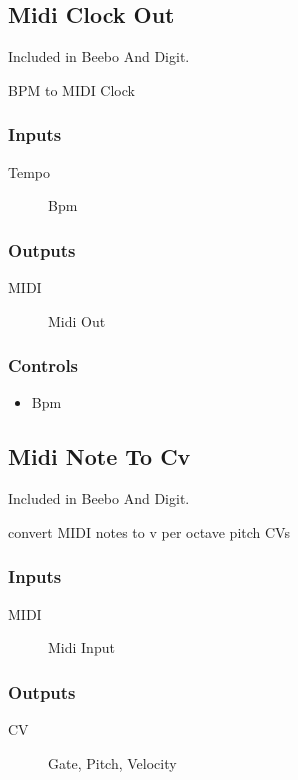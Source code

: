 \subsection{Midi Clock Out}

Included in Beebo And Digit.

BPM to MIDI Clock



\subsubsection{Inputs}
\begin{description}
\item [Tempo] Bpm
\end{description}

\subsubsection{Outputs}
\begin{description}
\item [MIDI] Midi Out
\end{description}

\subsubsection{Controls}
\begin{itemize}
\item Bpm
\end{itemize}

\subsection{Midi Note To Cv}

Included in Beebo And Digit.

convert MIDI notes to v per octave pitch CVs



\subsubsection{Inputs}
\begin{description}
\item [MIDI] Midi Input
\end{description}

\subsubsection{Outputs}
\begin{description}
\item [CV] Gate, Pitch, Velocity
\end{description}

